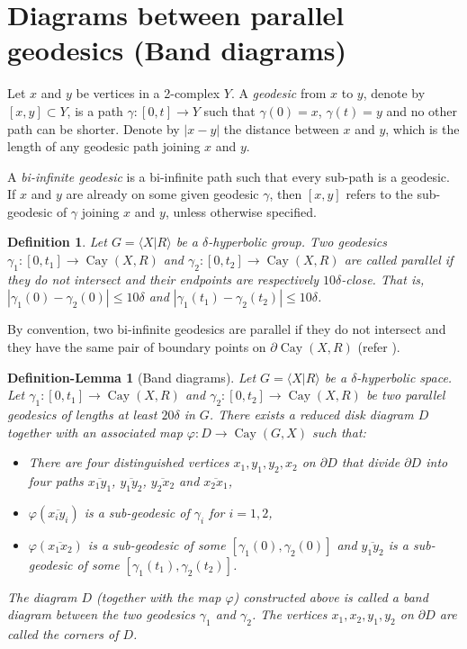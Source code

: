 \documentclass[a4paper]{article}
\DeclareMathOperator{\Cay}{Cay}
\newcommand\Pres[2]{\langle #1 | #2 \rangle}
\newtheorem{defi}[thm]{Definition}
\newtheorem{defilem}[thm]{Definition-Lemma}
\theoremstyle{remark}
\begin{document}
\section{Diagrams between parallel geodesics (Band diagrams)}

Let $x$ and $y$ be vertices in a 2-complex $Y$. A \textit{geodesic} from $x$ to $y$, denote by $[x, y]\subset Y$, is a path $\gamma:[0,t]\to Y$ such that $\gamma(0)=x$, $\gamma(t)=y$ and no other path can be shorter. Denote by $|x - y|$ the distance between $x$ and $y$, which is the length of any geodesic path joining $x$ and $y$. 

A \textit{bi-infinite geodesic} is a bi-infinite path such that every sub-path is a geodesic. If $x$ and $y$ are already on some given geodesic $\gamma$, then $[x, y]$ refers to the sub-geodesic of $\gamma$ joining $x$ and $y$, unless otherwise specified.

\begin{defi} Let $G = \Pres{X}{R}$ be a $\delta$-hyperbolic group. Two geodesics $\gamma_1:[0,t_1]\to\Cay(X,R)$ and $\gamma_2:[0,t_2]\to\Cay(X,R)$ are called \textit{parallel} if they do not intersect and their endpoints are respectively $10\delta$-close. That is, $|\gamma_1(0)-\gamma_2(0)|\leq 10\delta$ and $|\gamma_1(t_1)-\gamma_2(t_2)|\leq 10\delta$.
\end{defi} 

By convention, two bi-infinite geodesics are parallel if they do not intersect and they have the same pair of boundary points on $\partial\Cay(X,R)$ (refer \cite{CDP90}).\\

\begin{defilem}[Band diagrams]\label{band diagram} Let $G = \langle X|R \rangle$ be a $\delta$-hyperbolic space. Let $\gamma_1:[0,t_1]\to\Cay(X,R)$ and $\gamma_2:[0,t_2]\to\Cay(X,R)$ be two parallel geodesics of lengths at least $20\delta$ in $G$. There exists a \textup{reduced disk diagram} $D$ together with an associated map $\varphi:D\to \Cay(G,X)$ such that:
\begin{itemize}
    \item There are four distinguished vertices $x_1,y_1,y_2,x_2$ on $\partial D$ that divide $\partial D$ into four paths $\overline{x_1y_1}$, $\overline{y_1y_2}$, $\overline{y_2x_2}$ and $\overline{x_2x_1}$,
    
    \item $\varphi(\overline{x_iy_i})$ is a sub-geodesic of $\gamma_i$ for $i = 1,2$,

    \item $\varphi(\overline{x_1x_2})$ is a sub-geodesic of some $[\gamma_1(0),\gamma_2(0)]$ and $\overline{y_1y_2}$ is a sub-geodesic of some $[\gamma_1(t_1),\gamma_2(t_2)]$.
\end{itemize}
The diagram $D$ (together with the map $\varphi$) constructed above is called a \textup{band diagram} between the two geodesics $\gamma_1$ and $\gamma_2$. The vertices $x_1,x_2,y_1,y_2$ on $\partial D$ are called the \textup{corners} of $D$.
\end{defilem}
\end{document}
